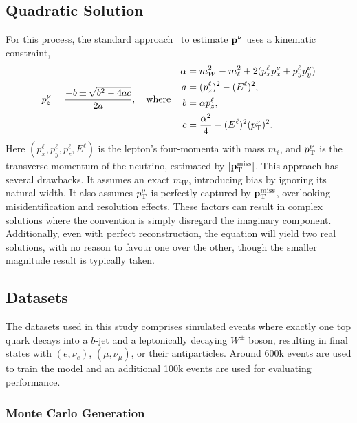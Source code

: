 \subsection{Quadratic Solution}

For this process, the standard approach~\cite{Quad1, Quad2, Quad4, Quad5} to estimate $\mathbf{p}^\nu$ uses a kinematic constraint,
\begin{equation}
    \label{eq:quadratic}
    p_z^\nu = \frac{-b \pm \sqrt{b^2-4ac}}{2a}, \quad \text{where} \quad
    \begin{aligned}
        \alpha & = m_W^2 - m_\ell^2+2(p_x^\ell p_x^\nu+p_y^\ell p_y^\nu) \\
        a      & = (p_z^\ell)^2 - (E^\ell)^2,                            \\
        b      & = \alpha p_z^\ell,                                      \\
        c      & = \frac{\alpha^2}{4}-(E^\ell)^2(p_\mathrm{T}^\nu)^2.
    \end{aligned}
\end{equation}
Here $(p_x^\ell, p_y^\ell, p_z^\ell, E^\ell)$ is the lepton's four-momenta with mass $m_\ell$, and $p_\mathrm{T}^\nu$ is the transverse momentum of the neutrino, estimated by $|\mathbf{p}_\mathrm{T}^{\mathrm{miss}}|$.
This approach has several drawbacks.
It assumes an exact $m_W$, introducing bias by ignoring its natural width.
It also assumes $p_\mathrm{T}^\nu$ is perfectly captured by $\mathbf{p}_\mathrm{T}^{\mathrm{miss}}$, overlooking misidentification and resolution effects.
These factors can result in complex solutions where the convention is simply disregard the imaginary component.
Additionally, even with perfect reconstruction, the equation will yield two real solutions, with no reason to favour one over the other, though the smaller magnitude result is typically taken.

\subsection{Datasets}
\label{sec:nu_data}

The datasets used in this study comprises simulated \ttbar events where exactly one top quark decays into a $b$-jet and a leptonically decaying $W^\pm$ boson, resulting in final states with $(e,\nu_e)$, $(\mu,\nu_\mu)$, or their antiparticles.
Around 600k events are used to train the model and an additional 100k events are used for evaluating performance.

\subsubsection{Monte Carlo Generation}

